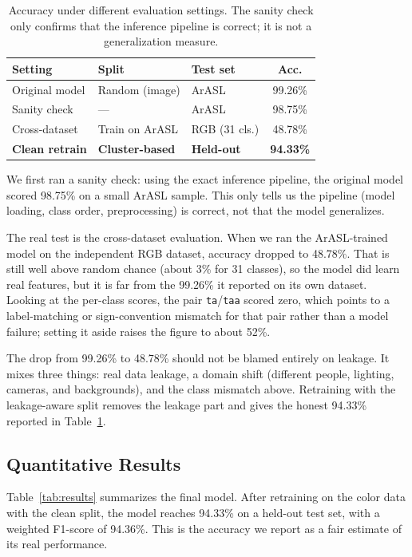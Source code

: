 \begin{table}[t]
\centering
\caption{Accuracy under different evaluation settings. The sanity check only
confirms that the inference pipeline is correct; it is not a generalization
measure.}
\label{tab:regimes}
\begin{tabular}{lll c}
\toprule
\textbf{Setting} & \textbf{Split} & \textbf{Test set} & \textbf{Acc.}\\
\midrule
Original model      & Random (image) & ArASL          & 99.26\% \\
Sanity check        & ---            & ArASL          & 98.75\% \\
Cross-dataset       & Train on ArASL & RGB (31 cls.)  & 48.78\% \\
\textbf{Clean retrain} & \textbf{Cluster-based} & \textbf{Held-out} & \textbf{94.33\%} \\
\bottomrule
\end{tabular}
\end{table}

We first ran a sanity check: using the exact inference pipeline, the original model
scored 98.75\% on a small ArASL sample. This only tells us the pipeline (model
loading, class order, preprocessing) is correct, not that the model generalizes.

The real test is the cross-dataset evaluation. When we ran the ArASL-trained model
on the independent RGB dataset, accuracy dropped to 48.78\%. That is still well
above random chance (about 3\% for 31 classes), so the model did learn real
features, but it is far from the 99.26\% it reported on its own dataset. Looking at
the per-class scores, the pair \texttt{ta}/\texttt{taa} scored zero, which points
to a label-matching or sign-convention mismatch for that pair rather than a model
failure; setting it aside raises the figure to about 52\%.

The drop from 99.26\% to 48.78\% should not be blamed entirely on leakage. It mixes
three things: real data leakage, a domain shift (different people, lighting,
cameras, and backgrounds), and the class mismatch above. Retraining with the
leakage-aware split removes the leakage part and gives the honest 94.33\% reported
in Table~\ref{tab:regimes}.

\subsection{Quantitative Results}
Table~\ref{tab:results} summarizes the final model. After retraining on the color
data with the clean split, the model reaches 94.33\% on a held-out test set, with a
weighted F1-score of 94.36\%. This is the accuracy we report as a fair estimate of
its real performance.


